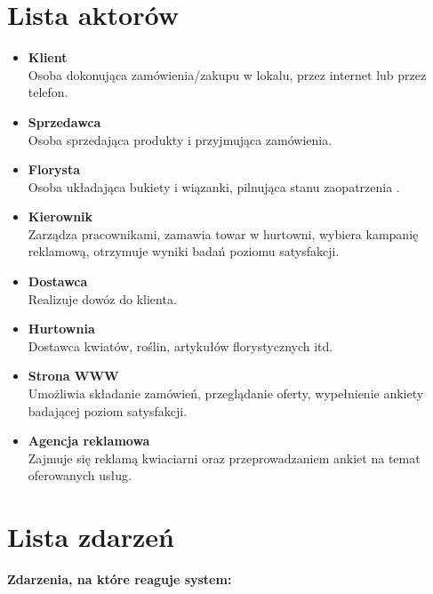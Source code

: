 \documentclass[a4paper,12pt]{article}
\begin{document}
	\section{Lista aktorów}
	\begin{itemize}
		\setlength\itemsep{1em}
		\item \textbf{\large{Klient}}\\
		Osoba dokonująca zamówienia/zakupu w lokalu, przez internet lub przez telefon.
		\item \textbf{\large{Sprzedawca}}\\
		Osoba sprzedająca produkty i przyjmująca zamówienia. 
		\item \textbf{\large{Florysta}}\\
		Osoba układająca bukiety i wiązanki, pilnująca stanu zaopatrzenia .
		\item \textbf{\large{Kierownik}}\\
		Zarządza pracownikami, zamawia towar w hurtowni, wybiera kampanię reklamową, otrzymuje wyniki badań poziomu satysfakcji.
		\item \textbf{\large{Dostawca}}\\
		Realizuje dowóz do klienta.
		\item \textbf{\large{Hurtownia}}\\
		Dostawca kwiatów, roślin, artykułów florystycznych itd.
		\item \textbf{\large{Strona WWW}}\\
		Umożliwia składanie zamówień, przeglądanie oferty, wypełnienie ankiety badającej poziom satysfakcji. 
		\item \textbf{\large{Agencja reklamowa}}\\
		Zajmuje się reklamą kwiaciarni oraz przeprowadzaniem ankiet na temat oferowanych usług.
	\end{itemize}
	\newpage
	
	\section{Lista zdarzeń}
    \textbf{Zdarzenia, na które reaguje system: }
    
\end{document}
